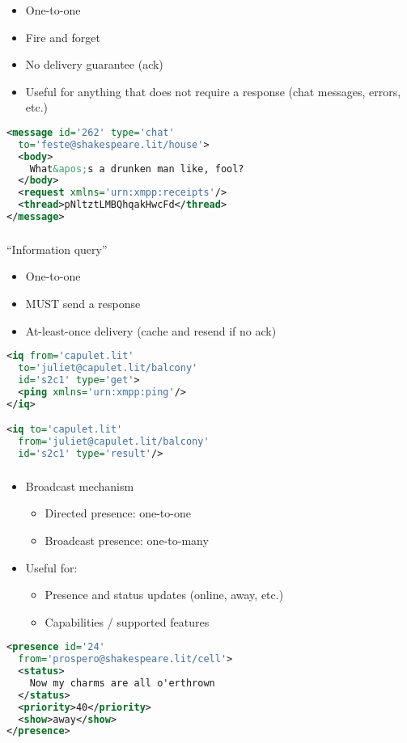\documentclass[xelatex,aspectratio=169]{beamer}
\makeatletter
\newcommand*{\xml}{\@ifstar{\@xmlStar}{\@xmlNoStar}}
\newcommand*{\@xmlNoStar}[1]{\texttt{\textless #1\textgreater}}
\newcommand*{\@xmlStar}[1]{\texttt{\textless/#1\textgreater}}
\newcommand*{\stanza}[1]{\xml{#1/}}
\makeatother
\begin{document}
\begin{frame}[fragile]
	\frametitle{\stanza{message}}
	\begin{itemize}
	\item One-to-one
	\item Fire and forget
	\item No delivery guarantee (ack)
	\item Useful for anything that does not require a response (chat messages, errors, etc.)
	\end{itemize}
	\begin{lstlisting}[frame=single,language=xml]
<message id='262' type='chat'
  to='feste@shakespeare.lit/house'>
  <body>
    What&apos;s a drunken man like, fool?
  </body>
  <request xmlns='urn:xmpp:receipts'/>
  <thread>pNltztLMBQhqakHwcFd</thread>
</message>
\end{lstlisting}
\end{frame}

\begin{frame}[fragile]
	\frametitle{\stanza{iq}}
	``Information query''
		\begin{itemize}
		\item One-to-one
		\item MUST send a response
		\item At-least-once delivery (cache and resend if no ack)
		\end{itemize}
\begin{lstlisting}[frame=single,language=xml]
<iq from='capulet.lit'
  to='juliet@capulet.lit/balcony'
  id='s2c1' type='get'>
  <ping xmlns='urn:xmpp:ping'/>
</iq>

<iq to='capulet.lit'
  from='juliet@capulet.lit/balcony'
  id='s2c1' type='result'/>
\end{lstlisting}
\end{frame}

\begin{frame}[fragile]
	\frametitle{\stanza{presence}}
	\begin{itemize}
	\item Broadcast mechanism
	\begin{itemize}
		\item Directed presence: one-to-one
		\item Broadcast presence: one-to-many
	\end{itemize}
	\item Useful for:
	\begin{itemize}
		\item Presence and status updates (online, away, etc.)
		\item Capabilities / supported features
	\end{itemize}
	\end{itemize}
\begin{lstlisting}[frame=single,language=xml]
<presence id='24'
  from='prospero@shakespeare.lit/cell'>
  <status>
    Now my charms are all o'erthrown
  </status>
  <priority>40</priority>
  <show>away</show>
</presence>
\end{lstlisting}
\end{frame}
\end{document}
